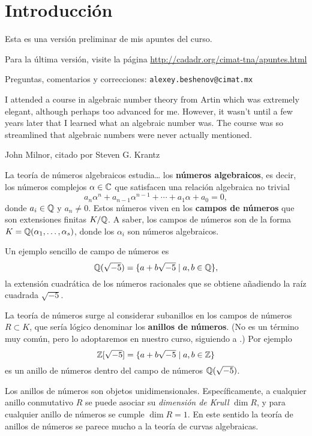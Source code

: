 \chapter*{Introducción}

\begin{framed}
  Esta es una versión preliminar de mis apuntes del curso.

  Para la última versión, visite la página
  \url{http://cadadr.org/cimat-tna/apuntes.html}

  Preguntas, comentarios y correcciones:
  \texttt{alexey.beshenov@cimat.mx}
\end{framed}

\epigraph{I attended a course in algebraic number theory from Artin which was
  extremely elegant, although perhaps too advanced for me. However, it wasn't
  until a few years later that I learned what an algebraic number was. The
  course was so streamlined that algebraic numbers were never actually
  mentioned.}
  {John Milnor, citado por Steven G. Krantz}

La teoría de números algebraicos estudia\dots{} los
\textbf{números algebraicos}, es decir, los números complejos $\alpha \in \mathbb{C}$
que satisfacen una relación algebraica no trivial
$$a_n \alpha^n + a_{n-1} \alpha^{n-1} + \cdots + a_1 \alpha + a_0 = 0,$$
donde $a_i \in \mathbb{Q}$ y $a_n \ne 0$. Estos números viven en
los \textbf{campos de números} que son extensiones finitas $K/\mathbb{Q}$.
A saber, los campos de números son de la forma $K = \mathbb{Q}
(\alpha_1,\ldots,\alpha_s)$, donde los $\alpha_i$ son números algebraicos.

Un ejemplo sencillo de campo de números es
$$\mathbb{Q} (\sqrt{-5}) = \{ a + b\sqrt{-5} \mid a,b \in \mathbb{Q} \},$$
la extensión cuadrática de los números racionales que se obtiene añadiendo la
raíz cuadrada $\sqrt{-5}$.

La teoría de números surge al considerar subanillos en los campos de números
$R \subset K$, que sería lógico denominar los \textbf{anillos de números}.
(No es un término muy común, pero lo adoptaremos en nuestro curso, siguiendo
a \cite{Stevenhagen-NR}.) Por ejemplo
$$\mathbb{Z} [\sqrt{-5}] = \{ a + b\sqrt{-5} \mid a,b \in \mathbb{Z} \}$$
es un anillo de números dentro del campo de números $\mathbb{Q} (\sqrt{-5})$.

Los anillos de números son objetos unidimensionales. Específicamente, a
cualquier anillo conmutativo $R$ se puede asociar su \emph{dimensión de Krull}
$\dim R$, y para cualquier anillo de números se cumple $\dim R = 1$. En este
sentido la teoría de anillos de números se parece mucho a la teoría de curvas
algebraicas.


